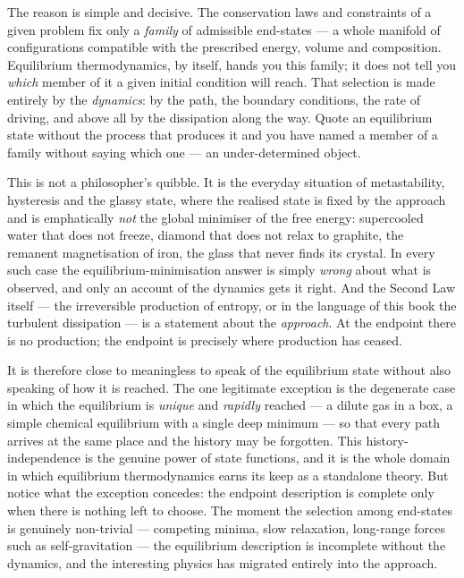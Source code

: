 The reason is simple and decisive. The conservation laws and constraints of a given
problem fix only a \emph{family} of admissible end-states --- a whole manifold of
configurations compatible with the prescribed energy, volume and composition.
Equilibrium thermodynamics, by itself, hands you this family; it does not tell you
\emph{which} member of it a given initial condition will reach. That selection is
made entirely by the \emph{dynamics}: by the path, the boundary conditions, the rate
of driving, and above all by the dissipation along the way. Quote an equilibrium
state without the process that produces it and you have named a member of a family
without saying which one --- an under-determined object.

This is not a philosopher's quibble. It is the everyday situation of metastability,
hysteresis and the glassy state, where the realised state is fixed by the approach
and is emphatically \emph{not} the global minimiser of the free energy: supercooled
water that does not freeze, diamond that does not relax to graphite, the remanent
magnetisation of iron, the glass that never finds its crystal. In every such case
the equilibrium-minimisation answer is simply \emph{wrong} about what is observed,
and only an account of the dynamics gets it right. And the Second Law itself ---
the irreversible production of entropy, or in the language of this book the
turbulent dissipation --- is a statement about the \emph{approach}. At the endpoint
there is no production; the endpoint is precisely where production has ceased.

It is therefore close to meaningless to speak of the equilibrium state without also
speaking of how it is reached. The one legitimate exception is the degenerate case
in which the equilibrium is \emph{unique} and \emph{rapidly} reached --- a dilute
gas in a box, a simple chemical equilibrium with a single deep minimum --- so that
every path arrives at the same place and the history may be forgotten. This
history-independence is the genuine power of state functions, and it is the whole
domain in which equilibrium thermodynamics earns its keep as a standalone theory.
But notice what the exception concedes: the endpoint description is complete only
when there is nothing left to choose. The moment the selection among end-states is
genuinely non-trivial --- competing minima, slow relaxation, long-range forces such
as self-gravitation --- the equilibrium description is incomplete without the
dynamics, and the interesting physics has migrated entirely into the approach.

